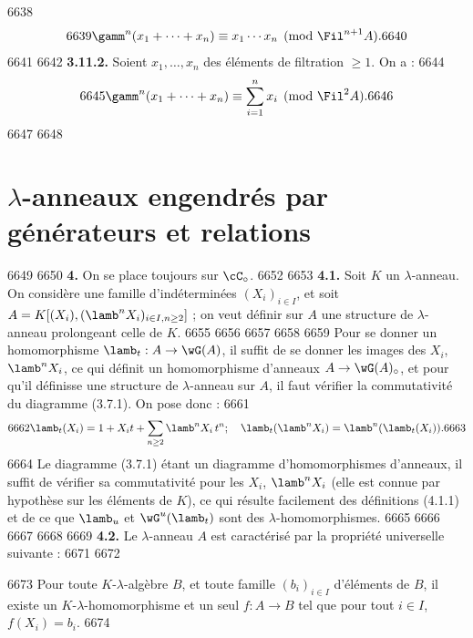   6638	\begin{equation}
  6639	\gamm^n(x_1 + \cdots + x_n) \equiv x_1 \cdots x_n \pmod{\Fil^{n+1} A}.
  6640	\end{equation}
  6641	
  6642		\noindent\textbf{3.11.2.} Soient $x_1, \ldots, x_n$ des \'el\'ements de filtration $\geq 1$. On a :
  6644	\begin{equation}
  6645	\gamm^n(x_1 + \cdots + x_n) \equiv \sum_{i=1}^n x_i \pmod{\Fil^2 A}.
  6646	\end{equation}
  6647	
  6648	\section{$\lambda$-anneaux engendr\'es par g\'en\'erateurs et relations}
  6649	
  6650		\noindent\textbf{4.} On se place toujours sur $\cC_\circ$.
  6652	
  6653		\noindent\textbf{4.1.} Soit $K$ un $\lambda$-anneau. On consid\`ere une famille d'ind\'etermin\'ees $(X_i)_{i \in I}$, et soit $A = K[(X_i), (\lamb^n X_i)_{i \in I, n \geq 2}]$ ; on veut d\'efinir sur $A$ une structure de $\lambda$-anneau prolongeant celle de $K$.
  6655	
  6656	%
  6657	%
  6658	%
  6659		\noindent Pour se donner un homomorphisme $\lamb_t : A \to \wG(A)$, il suffit de se donner les images des $X_i$, $\lamb^n X_i$, ce qui d\'efinit un homomorphisme d'anneaux $A \to \wG(A)_\circ$, et pour qu'il d\'efinis\-se une structure de $\lambda$-anneau sur $A$, il faut v\'erifier la commutativit\'e du diagramme (3.7.1). On pose donc :
  6661	\begin{equation}
  6662	\lamb_t(X_i) = 1 + X_i t + \sum_{n \geq 2} \lamb^n X_i \, t^n ; \quad \lamb_t(\lamb^n X_i) = \lamb^n(\lamb_t(X_i)).
  6663	\end{equation}
  6664	Le diagramme (3.7.1) \'etant un diagramme d'homomorphismes d'anneaux, il suffit de v\'erifier sa commutativit\'e pour les $X_i$, $\lamb^n X_i$ (elle est connue par hypoth\`ese sur les \'el\'ements de $K$), ce qui r\'esulte facilement des d\'efinitions (4.1.1) et de ce que $\lamb_u$ et $\wG^u(\lamb_t)$ sont des $\lambda$-homomorphismes.
  6665	
  6666	%
  6667	%
  6668	%
  6669		\noindent\textbf{4.2.} Le $\lambda$-anneau $A$ est caract\'eris\'e par la propri\'et\'e universelle suivante :
  6671	
  6672	\begin{proposition}
  6673	Pour toute $K$-$\lambda$-alg\`ebre $B$, et toute famille $(b_i)_{i \in I}$ d'\'el\'ements de $B$, il existe un $K$-$\lambda$-homomorphisme et un seul $f : A \to B$ tel que pour tout $i \in I$, $f(X_i) = b_i$.
  6674	\end{proposition}
